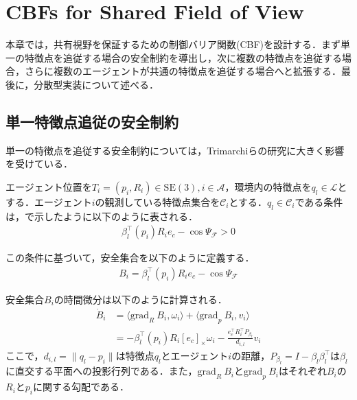 \section{CBFs for Shared Field of View}

本章では，共有視野を保証するための制御バリア関数(CBF)を設計する．まず単一の特徴点を追従する場合の安全制約を導出し，次に複数の特徴点を追従する場合，さらに複数のエージェントが共通の特徴点を追従する場合へと拡張する．最後に，分散型実装について述べる．

\subsection{単一特徴点追従の安全制約}

単一の特徴点を追従する安全制約については，Trimarchiら\cite{Trimarchi2025}の研究に大きく影響を受けている．

エージェント位置を$T_i=(p_i, R_i)\in \mathrm{SE}(3), i\in\mathcal{A}$，環境内の特徴点を$q_l\in \mathcal{L}$とする．エージェント$i$の観測している特徴点集合を$\mathcal{C}_i$とする．$q_l\in\mathcal{C}_i$である条件は，で示したように以下のように表される．
\begin{equation}
\begin{aligned}
\beta_l^{\top}(p_i)R_ie_c-\cos\Psi_\mathcal{F}>0
\label{eq:fov_condition_single}
\end{aligned}
\end{equation}

この条件に基づいて，安全集合を以下のように定義する．
\begin{equation}
\begin{aligned}
B_{i} = \beta_l^{\top}(p_i)R_ie_c-\cos\Psi_\mathcal{F}
\label{eq:safe_set_single}
\end{aligned}
\end{equation}

安全集合$B_i$の時間微分は以下のように計算される．
\begin{equation}
\begin{aligned}
\dot{B}_{i} &= \langle \mathrm{grad}_R\:B_i,\omega_i\rangle + \langle \mathrm{grad}_p\:B_i,v_i\rangle \\
&= -\beta_l^\top(p_i) R_i [e_c]_\times\omega_i - \frac{e_c^\top R_i^\top P_{\beta_l}}{d_{i,l}}v_i
\label{eq:safe_set_derivative_single}
\end{aligned}
\end{equation}
ここで，$d_{i,l}={\|q_l-p_i\|}$は特徴点$q_l$とエージェント$i$の距離，$P_{\beta_l} = I-\beta_l\beta_l^\top$は$\beta_l$に直交する平面への投影行列である．また，$\mathrm{grad}_R\:B_i$と$\mathrm{grad}_p\:B_i$はそれぞれ$B_i$の$R_i$と$p_i$に関する勾配である．

